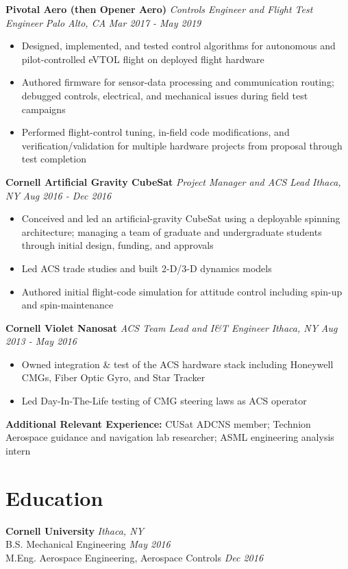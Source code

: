 \documentclass[10pt,letterpaper]{extarticle}
\newcommand{\role}[4]{%
  \textbf{#1} \textbar{} \textit{#3} \hfill {\color{muted}\if\relax\detokenize{#2}\relax\else\textit{#2} \textbar{} \fi\textit{#4}}\par\vspace{-2pt}%
}
\begin{document}
\role{Pivotal Aero (then Opener Aero)}{Palo Alto, CA}{Controls Engineer and Flight Test Engineer}{Mar 2017 - May 2019}
\begin{itemize}
  \item Designed, implemented, and tested control algorithms for autonomous and pilot-controlled eVTOL flight on deployed flight hardware
  \item Authored firmware for sensor-data processing and communication routing; debugged controls, electrical, and mechanical issues during field test campaigns
  \item Performed flight-control tuning, in-field code modifications, and verification/validation for multiple hardware projects from proposal through test completion
\end{itemize}

\role{Cornell Artificial Gravity CubeSat}{Ithaca, NY}{Project Manager and ACS Lead}{Aug 2016 - Dec 2016}
\begin{itemize}
  \item Conceived and led an artificial-gravity CubeSat using a deployable spinning architecture; managing a team of graduate and undergraduate students through initial design, funding, and approvals
  \item Led ACS trade studies and built 2-D/3-D dynamics models
  \item Authored initial flight-code simulation for attitude control including spin-up and spin-maintenance 
\end{itemize}

\role{Cornell Violet Nanosat}{Ithaca, NY}{ACS Team Lead and I\&T Engineer}{Aug 2013 - May 2016}
\begin{itemize}
  \item Owned integration \& test of the ACS hardware stack including Honeywell CMGs, Fiber Optic Gyro, and Star Tracker
  \item Led Day-In-The-Life testing of CMG steering laws as ACS operator
\end{itemize}

\textbf{Additional Relevant Experience:} CUSat ADCNS member; Technion Aerospace guidance and navigation lab researcher; ASML engineering analysis intern

\section{Education}
\textbf{Cornell University} \hfill {\color{muted}\textit{Ithaca, NY}}\\
B.S. Mechanical Engineering \hfill {\color{muted}\textit{May 2016}}\vspace{1pt}\\
M.Eng. Aerospace Engineering, Aerospace Controls \hfill {\color{muted}\textit{Dec 2016}}
\end{document}
